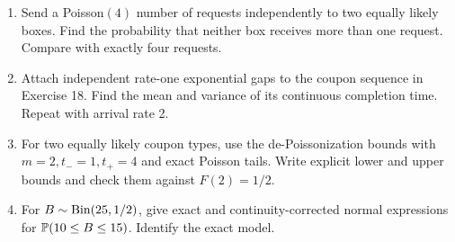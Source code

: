 \begin{exercisebox}[title={Further practice: mechanisms and Poissonization}]
\begin{enumerate}[start=18,itemsep=1pt,parsep=0pt]
 \item Send a Poisson$(4)$ number of requests independently to two
 equally likely boxes. Find the probability that neither box receives
 more than one request. Compare with exactly four requests.
 \item Attach independent rate-one exponential gaps to the coupon
 sequence in Exercise 18. Find the mean and variance of its continuous
 completion time. Repeat with arrival rate 2. 
 \item For two equally likely coupon types, use the de-Poissonization
 bounds with $m=2,t_-=1,t_+=4$ and exact Poisson tails. Write explicit
 lower and upper bounds and check them against $F(2)=1/2$.
 \item For $B\sim\Bin(25,1/2)$, give exact and continuity-corrected normal
 expressions for $\P(10\le B\le15)$. Identify the exact model.
\end{enumerate}
\end{exercisebox}
